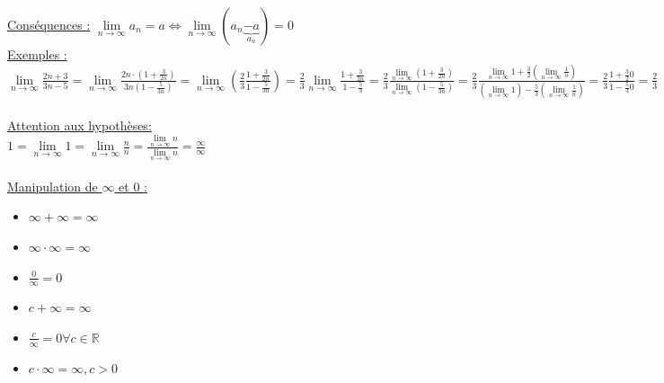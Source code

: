 \documentclass[12pt,a4paper]{article}
\newcommand{\limite}{\lim\limits_}
\newcommand{\ninf}{\ensuremath{n \to \infty}}
\newcommand{\R}{\ensuremath{\mathbb{R}} }
\begin{document}
{\underline{Conséquences :} $\limite{\ninf} a_n = a \Leftrightarrow \limite{\ninf}(a_n \underbrace{-a}_{a_n}) = 0$\\
\underline{Exemples :} 
$\limite{\ninf}\frac{2n+3}{3n-5} = 
\limite{\ninf}\frac{2n\cdot (1+ \frac{3}{2n})}{3n(1-\frac{5}{3n})} = 
\limite{\ninf}(\frac{2}{3} \frac{1+\frac{3}{2n}}{1-\frac{5}{3n}}) = 
\frac{2}{3} \limite{\ninf} \frac{1+ \frac{3}{2n}}{1- \frac{5}{3}} = 
\frac{2}{3} \frac{\limite{\ninf}(1+ \frac{3}{2n})}{\limite{\ninf} (1-\frac{5}{3n})} =
\frac{2}{3} \frac{\limite{\ninf} 1 + \frac{3}{2}(\limite{\ninf}\frac{1}{n})}{(\limite{\ninf}1) - \frac{5}{3} (\limite{\ninf}\frac{1}{n})} 
= \frac{2}{3} \frac{1+\frac{3}{2}0}{1-\frac{5}{3}0} = \frac{2}{3}$\\
\\
\underline{Attention aux hypothèses:}\\
$1 = \limite{\ninf} 1 = \limite{\ninf} \frac{n}{n} = \frac{\limite{\ninf} n}{\limite{\ninf} n} = \frac{\infty}{\infty}$\\
\\
\underline{Manipulation de $\infty$ et 0 :}\\
\begin{itemize}
\item$\infty + \infty = \infty$
\item$\infty\cdot\infty = \infty$
\item$\frac{0}{\infty} = 0$
\item$c + \infty = \infty$
\item$\frac{c}{\infty} = 0 \forall c \in \R$
\item$c \cdot\infty = \infty, c > 0$
\end{itemize}

}
\end{document}
